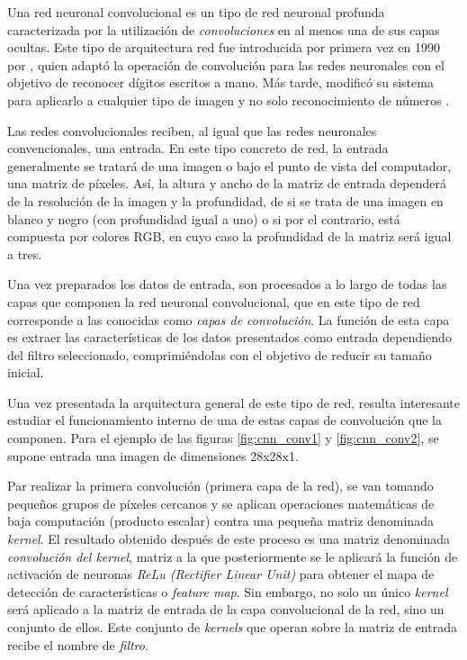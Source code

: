 Una red neuronal convolucional es un tipo de red neuronal profunda caracterizada por la utilización de \textit{convoluciones} en al menos una de sus capas ocultas. Este tipo de arquitectura red fue introducida por primera vez en 1990 por \citep{LeCun1989HandwrittenDR}, quien adaptó la operación de convolución para las redes neuronales con el objetivo de reconocer dígitos escritos a mano. Más tarde, modificó su sistema para aplicarlo a cualquier tipo de imagen y no solo reconocimiento de números \citep{cnn_lecun}.

Las redes convolucionales reciben, al igual que las redes neuronales convencionales, una entrada. En este tipo concreto de red, la entrada generalmente se tratará de una imagen o bajo el punto de vista del computador, una matriz de píxeles. Así, la altura y ancho de la matriz de entrada dependerá de la resolución de la imagen y la profundidad, de si se trata de una imagen en blanco y negro (con profundidad igual a uno) o si por el contrario, está compuesta por colores RGB, en cuyo caso la profundidad de la matriz será igual a tres.

Una vez preparados los datos de entrada, son procesados a lo largo de todas las capas que componen la red neuronal convolucional, que en este tipo de red corresponde a las conocidas como \textit{capas de convolución}. La función de esta capa es extraer las características de los datos presentados como entrada dependiendo del filtro seleccionado, comprimiéndolas con el objetivo de reducir su tamaño inicial. 

Una vez presentada la arquitectura general de este tipo de red, resulta interesante estudiar el funcionamiento interno de una de estas capas de convolución que la componen. Para el ejemplo de las figuras \ref{fig:cnn_conv1} y \ref{fig:cnn_conv2}, se supone entrada una imagen de dimensiones 28x28x1.  

Par realizar la primera convolución (primera capa de la red), se van tomando pequeños grupos de píxeles cercanos y se aplican operaciones matemáticas de baja computación (producto escalar) contra una pequeña matriz denominada \textit{kernel}. El resultado obtenido después de este proceso es una matriz denominada \textit{convolución del kernel}, matriz a la que posteriormente se le aplicará la función de activación de neuronas \textit{ReLu (Rectifier Linear Unit)} para obtener el mapa de detección de características o \textit{feature map}. Sin embargo, no solo un único \textit{kernel} será aplicado a la matriz de entrada de la capa convolucional de la red, sino un conjunto de ellos. Este conjunto de \textit{kernels} que operan sobre la matriz de entrada recibe el nombre de \textit{filtro}.


